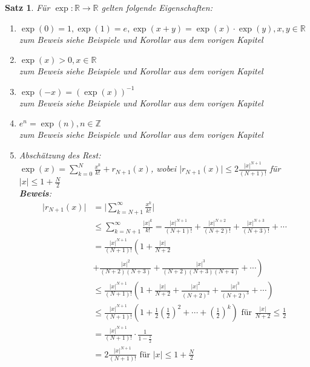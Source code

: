 \documentclass[ngerman,titlepage,twoside, parskip=half*]{scrreprt}
\newcommand*{\Z}{\mathbb{Z}}
\newcommand*{\R}{\mathbb{R}}
\theoremstyle{plain}
\newtheorem{theorem}{Satz}[section]
\theoremstyle{definition}
\theoremstyle{remark}
\newcommand*{\abs}[2][]{#1\lvert#2#1\rvert}
\begin{document}
\begin{theorem}
  \label{satz:expEigenschaft}
Für $\exp\colon\R\rightarrow\R$ gelten folgende Eigenschaften:
\begin{enumerate}[i]
  \item $\exp(0)=1, \exp(1)=e, \exp(x+y)=\exp(x)\cdot \exp(y), x,y \in \R$\\
    zum Beweis siehe Beispiele und Korollar aus dem vorigen Kapitel
  \item $\exp(x)>0, x\in \R$\\
    zum Beweis siehe Beispiele und Korollar aus dem vorigen Kapitel
  \item $\exp(-x)=(\exp(x))^{-1}$\\
    zum Beweis siehe Beispiele und Korollar aus dem vorigen Kapitel
  \item $e^n=\exp(n), n\in \Z$\\
    zum Beweis siehe Beispiele und Korollar aus dem vorigen Kapitel
  \item Abschätzung des Rest:\\
    $\exp(x)=\sum_{k=0}^N \frac{x^k}{k!}+r_{N+1}(x)$, wobei $\abs{r_{N+1}(x)}\leq 2\frac{\abs{x}^{N+1}}{(N+1)!}$ für $\abs{x}\leq 1+\frac{N}{2}$\\
    \textbf{Beweis}:
    \begin{align*}
      \abs{r_{N+1}(x)} &= \abs{\sum_{k=N+1}^\infty \frac{x^k}{k!}}\\
      &\leq \sum_{k=N+1}^\infty \frac{\abs{x}^k}{k!}=\frac{\abs{x}^{N+1}}{(N+1)!}+\frac{\abs{x}^{N+2}}{(N+2)!}+\frac{\abs{x}^{N+3}}{(N+3)!}+\cdots\\
      &= \frac{\abs{x}^{N+1}}{(N+1)!}\left( 1+\frac{\abs{x}}{N+2}\right.\\
      & \left. +\frac{\abs{x}^2}{(N+2)(N+3)}+\frac{\abs{x}^3}{(N+2)(N+3)(N+4)}+\cdots\right)\\
      &\leq \frac{\abs{x}^{N+1}}{(N+1)!}\left( 1+\frac{\abs{x}}{N+2}+\frac{\abs{x}^2}{(N+2)^2}+\frac{\abs{x}^3}{(N+2)^3}+\cdots \right)\\
      &\leq \frac{\abs{x}^{N+1}}{(N+1)!}\left( 1+\frac{1}{2}\left(\frac{1}{2}\right)^2+\cdots + \left(\frac{1}{2}\right)^k\right)
        \text{ für } \frac{\abs{x}}{N+2}\leq \frac{1}{2}\\
      &= \frac{\abs{x}^{N+1}}{(N+1)!}\cdot \frac{1}{1-\frac{1}{2}}\\
      &= 2\frac{\abs{x}^{N+1}}{(N+1)!} \text{ für } \abs{x}\leq 1+\frac{N}{2}
    \end{align*}
\end{enumerate}
\end{theorem}
\end{document}
